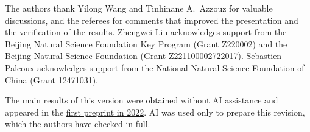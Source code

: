 \documentclass{amsart}
\begin{document}
\medskip
\begin{ac}
The authors thank Yilong Wang and Tinhinane A.~Azzouz for valuable discussions, and the referees for comments that improved the presentation and the verification of the results. Zhengwei Liu acknowledges support from the Beijing Natural Science Foundation Key Program (Grant Z220002) and the Beijing Natural Science Foundation (Grant Z221100002722017). Sebastien Palcoux acknowledges support from the National Natural Science Foundation of China (Grant 12471031).

The main results of this version were obtained without AI assistance and appeared in the \href{https://arxiv.org/abs/2203.06522v1}{first preprint in 2022}. AI was used only to prepare this revision, which the authors have checked in full.
\end{ac}
\end{document}

